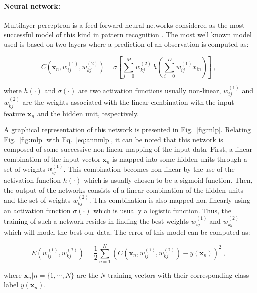 \paragraph{Neural network:} 
Multilayer perceptron is a feed-forward neural networks considered as the most successful model of this kind in pattern recognition \cite{Bishop2006}.
The most well known model used is based on two layers where a prediction of an observation is computed as:

\begin{equation}
	C(\mathbf{x}_n,w_{ij}^{(1)},w_{kj}^{(2)}) = \sigma \left[ \sum_{j=0}^{M} w_{kj}^{(2)} \  h \left( \sum_{i=0}^{D} w_{ij}^{(1)} x_{in} \right) \right] \ ,
	\label{eq:annmlp}
\end{equation}

\noindent where $h(\cdot)$ and $\sigma(\cdot)$ are two activation functions usually non-linear, $w_{ij}^{(1)}$ and $ w_{kj}^{(2)}$ are the weights associated with the linear combination with the input feature $\mathbf{x}_n$ and the hidden unit, respectively.



A graphical representation of this network is presented in Fig.~\ref{fig:mlp}.
Relating Fig.~\ref{fig:mlp} with Eq.~\eqref{eq:annmlp}, it can be noted that this network is composed of some successive non-linear mapping of the input data.
First, a linear combination of the input vector $\mathbf{x}_n$ is mapped into some hidden units through a set of weights $w_{ij}^{(1)}$.
This combination becomes non-linear by the use of the activation function $h(\cdot)$ which is usually chosen to be a sigmoid function.
Then, the output of the networks consists of a linear combination of the hidden units and the set of weights $w_{kj}^{(2)}$.
This combination is also mapped non-linearly using an activation function $\sigma(\cdot)$ which is usually a logistic function.
Thus, the training of such a network resides in finding the best weights $w_{ij}^{(1)}$ and $ w_{kj}^{(2)}$ which will model the best our data.
The error of this model can be computed as:

\begin{equation}
	E(w_{ij}^{(1)},w_{kj}^{(2)}) = \frac{1}{2} \sum_{n=1}^{N} \left( C(\mathbf{x}_n,w_{ij}^{(1)},w_{kj}^{(2)}) - y(\mathbf{x}_n) \right) ^{2} \ ,
	\label{eq:mlpcost}
\end{equation}

\noindent where $\mathbf{x}_n|n=\{1,\cdots,N\}$ are the $N$ training vectors with their corresponding class label $y(\mathbf{x}_n)$.

